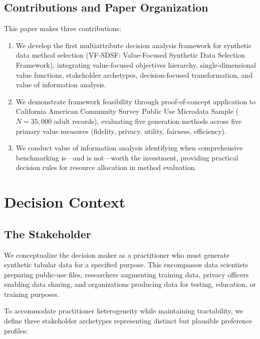 \documentclass[12pt,a4paper]{article}
\begin{document}
\subsection{Contributions and Paper Organization}

This paper makes three contributions:

\begin{enumerate}
    \item We develop the first multiattribute decision analysis framework for synthetic data method selection (VF-SDSF: Value-Focused Synthetic Data Selection Framework), integrating value-focused objectives hierarchy, single-dimensional value functions, stakeholder archetypes, decision-focused transformation, and value of information analysis.
    
    \item We demonstrate framework feasibility through proof-of-concept application to California American Community Survey Public Use Microdata Sample ($N=35{,}000$ adult records), evaluating five generation methods across five primary value measures (fidelity, privacy, utility, fairness, efficiency).
    
    \item We conduct value of information analysis identifying when comprehensive benchmarking is---and is not---worth the investment, providing practical decision rules for resource allocation in method evaluation.
\end{enumerate}

\section{Decision Context}

\subsection{The Stakeholder}

We conceptualize the decision maker as a practitioner who must generate synthetic tabular data for a specified purpose. This encompasses data scientists preparing public-use files, researchers augmenting training data, privacy officers enabling data sharing, and organizations producing data for testing, education, or training purposes.

To accommodate practitioner heterogeneity while maintaining tractability, we define three stakeholder archetypes representing distinct but plausible preference profiles:
\end{document}
